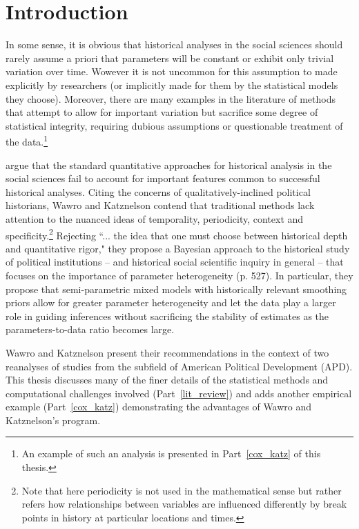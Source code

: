 \chapter{Introduction}
\label{introduction}

In some sense, it is obvious that historical analyses in the social sciences should rarely assume a priori that parameters will be constant or exhibit only trivial variation over time. Wowever it is not uncommon for this assumption to made explicitly by researchers (or implicitly made for them by the statistical models they choose). Moreover, there are many examples in the literature of methods that attempt to allow for important variation but sacrifice some degree of statistical integrity, requiring dubious assumptions or questionable treatment of the data.\footnote{An example of such an analysis is presented in Part~\ref{cox_katz} of this thesis.}  

 argue that the standard quantitative approaches for historical analysis in the social sciences fail to account for important features common to successful historical analyses. Citing the concerns of qualitatively-inclined political historians, Wawro and Katznelson contend that traditional methods lack attention to the nuanced ideas of temporality, periodicity, context and specificity.\footnote{Note that here periodicity is not used in the mathematical sense but rather refers how relationships between variables are influenced differently by break points in history at particular locations and times.}  Rejecting ``... the idea that one must choose between historical depth and quantitative rigor," they propose a Bayesian approach to the historical study of political institutions -- and historical social scientific inquiry in general --  that focuses on the importance of parameter heterogeneity (p. 527). In particular, they propose that semi-parametric mixed models with historically relevant smoothing priors allow for greater parameter heterogeneity and let the data play a larger role in guiding inferences without sacrificing the stability of estimates as the parameters-to-data ratio becomes large.  

Wawro and Katznelson present their recommendations in the context of two reanalyses of studies from the subfield of American Political Development (APD). This thesis discusses many of the finer details of the statistical methods and computational challenges involved (Part~\ref{lit_review}) and adds another empirical example (Part~\ref{cox_katz}) demonstrating the advantages of Wawro and Katznelson's program. 